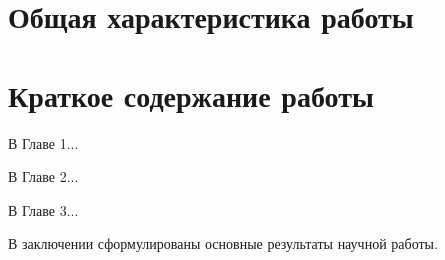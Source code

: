 
\section*{Общая характеристика работы}

\newcommand{\actuality}{\pdfbookmark[1]{Актуальность}{actuality}\textbf{Актуальность темы.}\enspace\ignorespaces}
\newcommand{\aim}{\pdfbookmark[1]{Цель}{aim}\textbf{Цель работы.}\enspace\ignorespaces}
\newcommand{\tasks}{\pdfbookmark[1]{Задачи}{tasks}\textbf{Задачи работы.}\enspace\ignorespaces}
\newcommand{\novelty}{\pdfbookmark[1]{Новизна}{novelty}\textbf{Научная новизна.}\enspace\ignorespaces}
\newcommand{\influence}{\pdfbookmark[1]{Значимость}{influence}\textbf{Практическая значимость.}\enspace\ignorespaces}
\newcommand{\methods}{\pdfbookmark[1]{Методы}{methods}\textbf{Методы и инструменты исследования.}\enspace\ignorespaces}
\newcommand{\defpositions}{\pdfbookmark[1]{Положения}{defpositions}\textbf{Основные положения, выносимые на защиту.}\enspace\ignorespaces}
\newcommand{\relevance}{\pdfbookmark[1]{Соответствие специальности}{relevance}\textbf{Соответствие специальность.}\enspace\ignorespaces}
\newcommand{\reliability}{\pdfbookmark[1]{Достоверность}{reliability}\textbf{Достоверность результатов проведённых исследований.}\enspace\ignorespaces}
\newcommand{\probation}{\pdfbookmark[1]{Апробация}{probation}\textbf{Апробация работы.}\enspace\ignorespaces}
\newcommand{\contribution}{\pdfbookmark[1]{Вклад}{contribution}\textbf{Личный вклад автора.}\enspace\ignorespaces}
\newcommand{\publications}{\pdfbookmark[1]{Публикации}{publications}\textbf{Публикации по теме диссертации.}\enspace\ignorespaces}




\section*{Краткое содержание работы}

В Главе 1...

В Главе 2...

В Главе 3...

В заключении сформулированы основные результаты научной работы.


